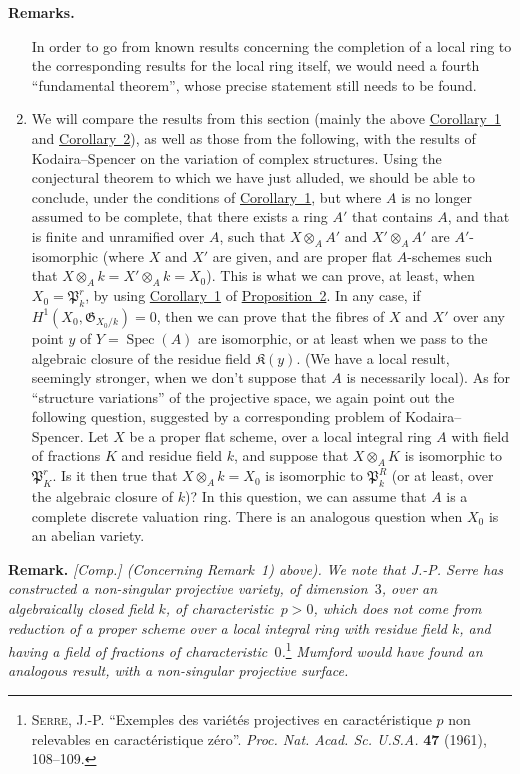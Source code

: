 \documentclass{article}
\newenvironment{rmenv}[1]
  {\phantomsection\par\medskip\noindent\textbf{#1.}\rmfamily}
  {\par\medskip}
\newcommand{\fk}{\mathfrak}
\newcommand{\kres}{\mathfrak{K}}
\DeclareMathOperator{\Spec}{Spec}
\begin{document}
\begin{rmenv}{Remarks}
\begin{enumerate}[1)]
      In order to go from known results concerning the completion of a local ring to the corresponding results for the local ring itself, we would need a fourth ``fundamental theorem'', whose precise statement still needs to be found.
    \item We will compare the results from this section (mainly the above \hyperref[theorem9corollary1]{Corollary~1} and \hyperref[theorem9corollary2]{Corollary~2}), as well as those from the following, with the results of Kodaira--Spencer on the variation of complex structures.
      Using the conjectural theorem to which we have just alluded, we should be able to conclude, under the conditions of \hyperref[theorem9corollary1]{Corollary~1}, but where $A$ is no longer assumed to be complete, that there exists a ring $A'$ that contains $A$, and that is finite and unramified over $A$, such that $X\otimes_AA'$ and $X'\otimes_AA'$ are $A'$-isomorphic (where $X$ and $X'$ are given, and are proper flat $A$-schemes such that $X\otimes_Ak=X'\otimes_Ak=X_0$).
      This is what we can prove, at least, when $X_0=\fk{P}_k^r$, by using \hyperref[proposition2corollary1]{Corollary~1} of \hyperref[proposition2]{Proposition~2}.
      In any case, if $H^1(X_0,\fk{G}_{X_0/k})=0$, then we can prove that the fibres of $X$ and $X'$ over any point $y$ of $Y=\Spec(A)$ are isomorphic, or at least when we pass to the algebraic closure of the residue field $\kres(y)$.
      (We have a local result, seemingly stronger, when we don't suppose that $A$ is necessarily local).
      As for ``structure variations'' of the projective space, we again point out the following question, suggested by a corresponding problem of Kodaira--Spencer.
      Let $X$ be a proper flat scheme, over a local integral ring $A$ with field of fractions $K$ and residue field $k$, and suppose that $X\otimes_AK$ is isomorphic to $\fk{P}_K^r$.
      Is it then true that $X\otimes_Ak=X_0$ is isomorphic to $\fk{P}_k^R$ (or at least, over the algebraic closure of $k$)?
      In this question, we can assume that $A$ is a complete discrete valuation ring.
      There is an analogous question when $X_0$ is an abelian variety.
  \end{enumerate}
\end{rmenv}

\begin{rmenv}{Remark}
  \emph{[Comp.] (Concerning Remark~1) above).}
  \emph{We note that J.-P. Serre has constructed a non-singular projective variety, of dimension~$3$, over an algebraically closed field $k$, of characteristic~$p>0$, which does not come from reduction of a proper scheme over a local integral ring with residue field $k$, and having a field of fractions of characteristic~$0$.}\footnote{\textsc{Serre, J.-P.} ``Exemples des vari\'{e}t\'{e}s projectives en caract\'{e}ristique $p$ non relevables en caract\'{e}ristique z\'{e}ro''. \emph{Proc. Nat. Acad. Sc. U.S.A.} \textbf{47} (1961), 108--109.}
  \emph{Mumford would have found an analogous result, with a non-singular projective \emph{surface}.}
\end{rmenv}
\end{document}
